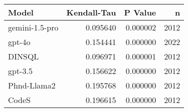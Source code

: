\begin{tabular}{lrrr}
\toprule
Model & Kendall-Tau & P Value & n \\
\midrule
gemini-1.5-pro & 0.095640 & 0.000002 & 2012 \\
gpt-4o & 0.154441 & 0.000000 & 2022 \\
DINSQL & 0.096971 & 0.000001 & 2012 \\
gpt-3.5 & 0.156622 & 0.000000 & 2012 \\
Phnd-Llama2 & 0.195768 & 0.000000 & 2012 \\
CodeS & 0.196615 & 0.000000 & 2012 \\
\bottomrule
\end{tabular}
